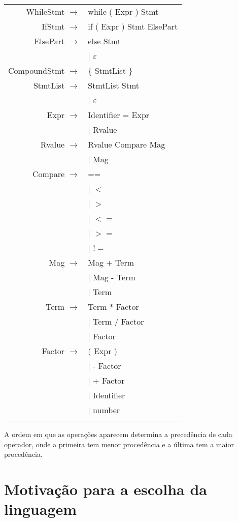 \documentclass[12pt]{article}
\begin{document}
\begin{longtable}{ r l }
	WhileStmt		$\rightarrow$ 	& while ( Expr ) Stmt \\
	IfStmt			$\rightarrow$ 	& if ( Expr ) Stmt ElsePart \\
	ElsePart		$\rightarrow$ 	& else Stmt \\
									& $|$ $\varepsilon$ \\
	CompoundStmt	$\rightarrow$ 	& \{ StmtList \} \\
	StmtList		$\rightarrow$ 	& StmtList Stmt \\
									& $|$ $\varepsilon$ \\
	Expr			$\rightarrow$ 	& Identifier = Expr \\
									& $|$ Rvalue \\
	Rvalue			$\rightarrow$ 	& Rvalue Compare Mag \\
									& $|$ Mag \\
	Compare			$\rightarrow$ 	& ==  \\
									& $|$ $<$ \\
									& $|$ $>$ \\
									& $|$ $<=$ \\
									& $|$ $>=$ \\
									& $|$ $!=$ \\
	Mag				$\rightarrow$ 	& Mag + Term \\
									& $|$ Mag - Term \\
									& $|$ Term \\
	Term			$\rightarrow$ 	& Term * Factor \\
									& $|$ Term / Factor \\
									& $|$ Factor \\
	Factor			$\rightarrow$ 	& ( Expr ) \\
									& $|$  - Factor \\
									& $|$  + Factor \\
									& $|$  Identifier \\
									& $|$  number \\ \\
\end{longtable}
		

A ordem em que as operações aparecem determina a precedência de cada operador, onde a primeira tem menor procedência e a última tem a maior procedência.


\section{Motivação para a escolha da linguagem}
\end{document}
